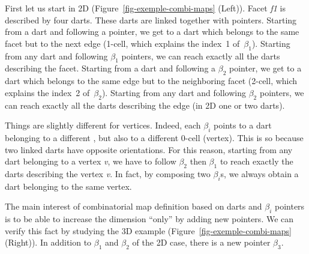 First let us start in 2D (Figure~\ref{fig-exemple-combi-maps} (Left)).
Facet \emph{f1} is described by four darts. These darts are linked
together with pointers. Starting from a dart and following a \betaun{} %
pointer, we get to a dart which belongs to the same facet but to the
next edge (1-cell, which explains the index~1 of~$\beta_1$).
Starting from any dart and following $\beta_1$ pointers, we can reach
exactly all the darts describing the facet.  Starting from a dart and
following a $\beta_2$ pointer, we get to a dart which belongs to the
same edge but to the neighboring facet (2-cell, which explains the
index~2 of~$\beta_2$).  Starting from any dart and following
$\beta_2$ pointers, we can reach exactly all the darts describing the
edge (in 2D one or two darts).

Things are slightly different for vertices.  Indeed, each $\beta_i$
points to a dart belonging to a different , but also to a
different 0-cell (vertex).  This is so because two linked darts have
opposite orientations.  For this reason, starting from any dart
belonging to a vertex \emph{v}, we have to follow $\beta_2$ then $\beta_1$
to reach exactly the darts describing the vertex \emph{v}.  In fact, by
composing two $\beta_i$s, we always obtain a dart belonging to the
same vertex.

The main interest of combinatorial map definition based on darts and
$\beta_i$ pointers is to be able to increase the dimension ``only'' by
adding new pointers. We can verify this fact by studying the 3D
example (Figure~\ref{fig-exemple-combi-maps} (Right)). In addition to
$\beta_1$ and $\beta_2$ of the 2D case, there is a new pointer
$\beta_3$.

